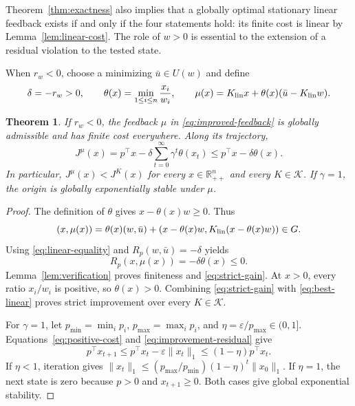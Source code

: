\documentclass[10pt]{article}
\newtheorem{theorem}{Theorem}
\newcommand{\R}{\mathbb R}
\begin{document}
Theorem~\ref{thm:exactness} also implies that a globally optimal stationary linear feedback exists if and only if the four statements hold: its finite cost is linear by Lemma~\ref{lem:linear-cost}. The role of $w>0$ is essential to the extension of a residual violation to the tested state.

When $r_w<0$, choose a minimizing $\bar u\in U(w)$ and define
\begin{equation}
 \delta=-r_w>0,\qquad
 \theta(x)=\min_{1\le i\le n}\frac{x_i}{w_i},\qquad
 \mu(x)=K_{\rm lin}x+\theta(x)(\bar u-K_{\rm lin}w).
 \label{eq:improved-feedback}
\end{equation}

\begin{theorem}
\label{thm:improvement}
If $r_w<0$, the feedback $\mu$ in \eqref{eq:improved-feedback} is globally admissible and has finite cost everywhere. Along its trajectory,
\begin{equation}
 J^\mu(x)=p^\top x-\delta\sum_{t=0}^\infty\gamma^t\theta(x_t)
 \le p^\top x-\delta\theta(x).
 \label{eq:strict-gain}
\end{equation}
In particular, $J^\mu(x)<J^K(x)$ for every $x\in\R_{++}^n$ and every $K\in\mathcal K$. If $\gamma=1$, the origin is globally exponentially stable under $\mu$.
\end{theorem}
\begin{proof}
The definition of $\theta$ gives $x-\theta(x)w\ge0$. Thus
\[
 (x,\mu(x))=\theta(x)(w,\bar u)
 +(x-\theta(x)w,K_{\rm lin}(x-\theta(x)w))\in G.
\]
Using \eqref{eq:linear-equality} and $R_p(w,\bar u)=-\delta$ yields
\begin{equation}
 R_p(x,\mu(x))=-\delta\theta(x)\le0.
 \label{eq:improvement-residual}
\end{equation}
Lemma~\ref{lem:verification} proves finiteness and \eqref{eq:strict-gain}. At $x>0$, every ratio $x_i/w_i$ is positive, so $\theta(x)>0$. Combining \eqref{eq:strict-gain} with \eqref{eq:best-linear} proves strict improvement over every $K\in\mathcal K$.

For $\gamma=1$, let $p_{\min}=\min_i p_i$, $p_{\max}=\max_i p_i$, and $\eta=\varepsilon/p_{\max}\in(0,1]$. Equations~\eqref{eq:positive-cost} and \eqref{eq:improvement-residual} give
\[
 p^\top x_{t+1}\le p^\top x_t-\varepsilon\|x_t\|_1
 \le(1-\eta)p^\top x_t.
\]
If $\eta<1$, iteration gives $\|x_t\|_1\le(p_{\max}/p_{\min})(1-\eta)^t\|x_0\|_1$. If $\eta=1$, the next state is zero because $p>0$ and $x_{t+1}\ge0$. Both cases give global exponential stability.
\end{proof}
\end{document}
